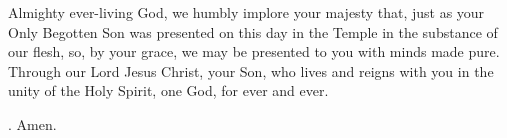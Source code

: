 \lettrine[lines=3]{A}{}lmighty ever-living God,
we humbly implore your majesty
that, just as your Only Begotten Son
was presented on this day in the Temple
in the substance of our flesh,
so, by your grace,
we may be presented to you with minds made pure.
Through our Lord Jesus Christ, your Son,
who lives and reigns with you in the unity of the Holy Spirit,
one God, for ever and ever. \par \Rbar. Amen.